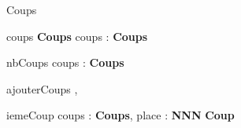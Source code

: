 \begin{algorithme}
  
  \begin{enregistrement}{Coups}
  \end{enregistrement}
\end{algorithme}

\vspace*{5mm}

\begin{algorithme}
  \small
  \fonction
      {coups}
      {}
      {\textbf{Coups}}
      {coups : \textbf{Coups}}
      {
	}
\end{algorithme}

\vspace*{5mm} 

\begin{algorithme}
  \small
  \fonction
      {nbCoups}
      {coups : \textbf{Coups}}
      {\naturel}
      {}
      {}
\end{algorithme}

\vspace*{5mm} 

\begin{algorithme}
  \small
  \procedure
      {ajouterCoups}
      {,}
      {}
      {
	}
\end{algorithme}

\vspace*{5mm} 

\begin{algorithme}
  \small
  \fonction
      {iemeCoup}
      {coups : \textbf{Coups}, place : \textbf{NNN} }
      {\textbf{Coup}
	}
      {}
      {}
      
\end{algorithme}
